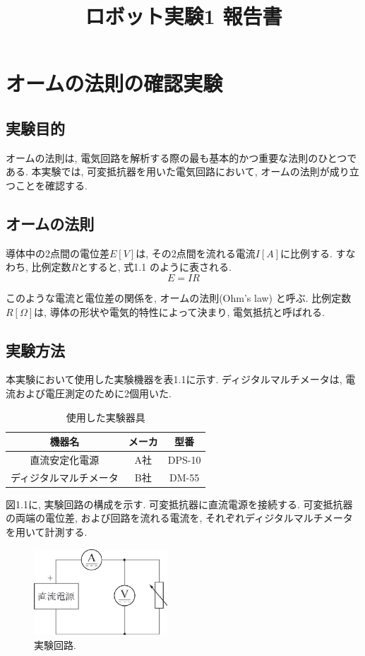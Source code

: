 \documentclass[a4paper,10pt]{jsarticle}
\title{ロボット実験1 報告書}
\begin{document}
	\section{オームの法則の確認実験}
		\subsection{実験目的}
		オームの法則は,  電気回路を解析する際の最も基本的かつ重要な法則のひとつである.  本実験では, 可変抵抗器を用いた電気回路において,  オームの法則が成り立つことを確認する.
		\subsection{オームの法則}
		導体中の2点間の電位差$E [V]$は,  その2点間を流れる電流$I[A]$に比例する.  すなわち,  比例定数$R$とすると,  式1.1 のように表される.
			\begin{equation}
				E = I R
				\label{:eq:ohm}
			\end{equation}
			
		このような電流と電位差の関係を,  オームの法則(Ohm's law) と呼ぶ.  比例定数$R [\Omega]$は,  導体の形状や電気的特性によって決まり,  電気抵抗と呼ばれる.
		\subsection{実験方法}
			本実験において使用した実験機器を表1.1に示す.  ディジタルマルチメータは,  電流および電圧測定のために2個用いた.
			\begin{table}[h]
			\caption{使用した実験器具}
				\label{equip}
				\begin{center}
				\begin{tabular}{|c|c|c|}\hline
				機器名 & メーカ & 型番 \\ \hline
				直流安定化電源 & A社 & DPS-10 \\ \hline
				ディジタルマルチメータ & B社 & DM-55 \\ \hline
				\end{tabular}
				\end{center}
			\end{table}
			
			図1.1に,  実験回路の構成を示す.  可変抵抗器に直流電源を接続する.  可変抵抗器の両端の電位差,  および回路を流れる電流を,  それぞれディジタルマルチメータを用いて計測する.
			
			\begin{figure}[h]
			\begin{center}
			\includegraphics[width=5cm]{circuit.eps}
			\end{center}
			\caption[]{実験回路. }
			\label{circuit}
			\end{figure}
			
\end{document}
